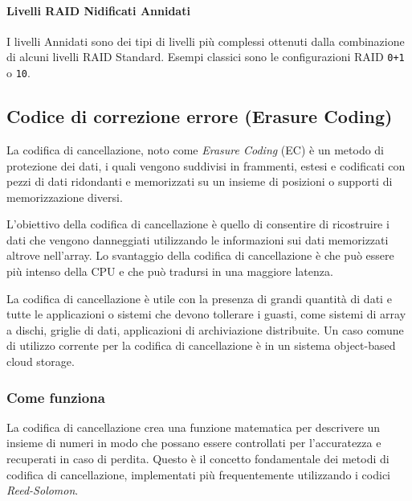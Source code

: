 \paragraph{Livelli RAID Nidificati Annidati}

I livelli Annidati sono dei tipi di livelli pi\`{u} complessi ottenuti dalla combinazione di alcuni livelli RAID Standard. Esempi classici sono le configurazioni RAID \verb"0+1" o \verb"10".


\item
\subsection{Codice di correzione errore (Erasure Coding)}
La codifica di cancellazione, noto come \emph{Erasure Coding} (EC) \`{e} un metodo di protezione dei dati, i quali vengono suddivisi in frammenti, estesi e codificati con pezzi di dati ridondanti e memorizzati su un insieme di posizioni o supporti di memorizzazione diversi.

L'obiettivo della codifica di cancellazione \`{e} quello di consentire di ricostruire i dati che vengono danneggiati utilizzando le informazioni sui dati memorizzati altrove nell'array. Lo svantaggio della codifica di cancellazione \`{e} che pu\`{o} essere pi\`{u} intenso della CPU e che pu\`{o} tradursi in una maggiore latenza.\cite{etichetta11}

La codifica di cancellazione \`{e} utile con la presenza di grandi quantit\`{a} di dati e tutte le applicazioni o sistemi che devono tollerare i guasti, come sistemi di array a dischi, griglie di dati, applicazioni di archiviazione distribuite. Un caso comune di utilizzo corrente per la codifica di cancellazione \`{e} in un sistema object-based cloud storage\cite{etichetta11}.

\subsubsection{Come funziona}
La codifica di cancellazione crea una funzione matematica per descrivere un insieme di numeri in modo che possano essere controllati per l'accuratezza e recuperati in caso di perdita. Questo \`{e} il concetto fondamentale dei metodi di codifica di cancellazione, implementati pi\`{u} frequentemente utilizzando i codici \textit{Reed-Solomon}\cite{etichetta11}. 

